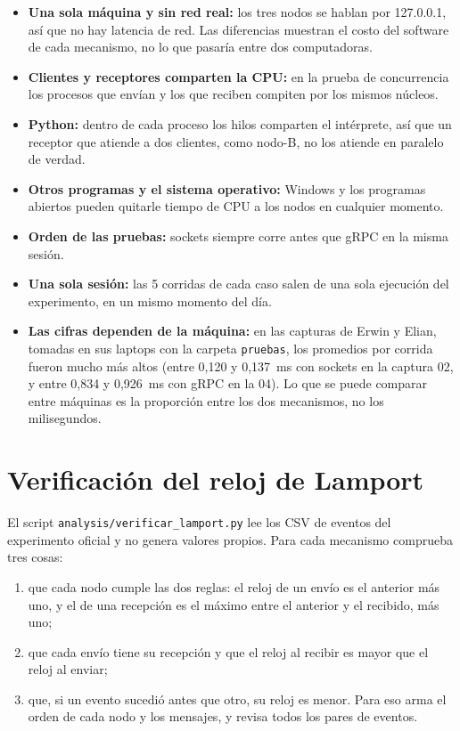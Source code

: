 \documentclass[11pt,a4paper]{article}
\begin{document}
\begin{itemize}[leftmargin=*]
  \item \textbf{Una sola máquina y sin red real:} los tres nodos se hablan por 127.0.0.1, así que no hay latencia de red. Las diferencias muestran el costo del software de cada mecanismo, no lo que pasaría entre dos computadoras.
  \item \textbf{Clientes y receptores comparten la CPU:} en la prueba de concurrencia los procesos que envían y los que reciben compiten por los mismos núcleos.
  \item \textbf{Python:} dentro de cada proceso los hilos comparten el intérprete, así que un receptor que atiende a dos clientes, como nodo-B, no los atiende en paralelo de verdad.
  \item \textbf{Otros programas y el sistema operativo:} Windows y los programas abiertos pueden quitarle tiempo de CPU a los nodos en cualquier momento.
  \item \textbf{Orden de las pruebas:} sockets siempre corre antes que gRPC en la misma sesión.
  \item \textbf{Una sola sesión:} las 5 corridas de cada caso salen de una sola ejecución del experimento, en un mismo momento del día.
  \item \textbf{Las cifras dependen de la máquina:} en las capturas de Erwin y Elian, tomadas en sus laptops con la carpeta \texttt{pruebas}, los promedios por corrida fueron mucho más altos (entre 0,120 y 0,137~ms con sockets en la captura 02, y entre 0,834 y 0,926~ms con gRPC en la 04). Lo que se puede comparar entre máquinas es la proporción entre los dos mecanismos, no los milisegundos.
\end{itemize}

\section{Verificación del reloj de Lamport}
\label{sec:lamport}

El script \texttt{analysis/verificar\_lamport.py} lee los CSV de eventos del experimento oficial y no genera valores propios. Para cada mecanismo comprueba tres cosas:

\begin{enumerate}[leftmargin=*]
  \item que cada nodo cumple las dos reglas: el reloj de un envío es el anterior más uno, y el de una recepción es el máximo entre el anterior y el recibido, más uno;
  \item que cada envío tiene su recepción y que el reloj al recibir es mayor que el reloj al enviar;
  \item que, si un evento sucedió antes que otro, su reloj es menor. Para eso arma el orden de cada nodo y los mensajes, y revisa todos los pares de eventos.
\end{enumerate}
\end{document}
